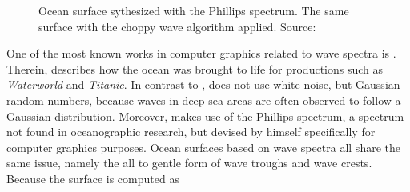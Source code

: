 %
\begin{figure}
 \centering
 \hfill
 \caption{
 Ocean surface sythesized with the Phillips spectrum.
 The same surface with the choppy wave algorithm applied.
Source: \cite{course:simulatingocean}
}
\label{fig:tessendorf_choppy_waves}
\end{figure}
%
One of the most known works in computer graphics related to wave spectra is
\cite{course:simulatingocean}. Therein, \citeauthor{course:simulatingocean}
describes how the ocean was brought to life for productions such as
\emph{Waterworld} and \emph{Titanic}. In contrast to \citeauthor{Mastin:1987},
\citeauthor{course:simulatingocean} does not use white noise, but Gaussian
random numbers, because waves in deep sea areas are often observed to follow a
Gaussian distribution. Moreover, \citeauthor{course:simulatingocean}
makes use of the Phillips spectrum, a spectrum not found in oceanographic
research, but devised by himself specifically for computer graphics purposes.
Ocean surfaces based on wave spectra all share the same issue, namely the all to
gentle form of wave troughs and wave crests. Because the surface is computed as

